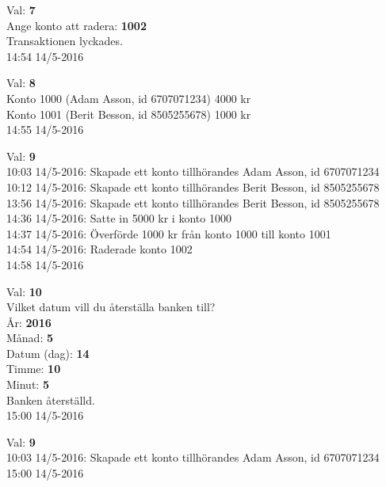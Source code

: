 \begin{multicols}{2}
\begin{exampleblock}
Val: \textbf{7}\\
Ange konto att radera: \textbf{1002}\\
Transaktionen lyckades.\\
14:54 14/5-2016\\
\end{exampleblock}
\begin{exampleblock}
Val: \textbf{8}\\
Konto 1000 (Adam Asson, id 6707071234) 4000 kr\\
Konto 1001 (Berit Besson, id 8505255678) 1000 kr\\
14:55 14/5-2016\\
\end{exampleblock}
\begin{exampleblock}
Val: \textbf{9}\\
10:03 14/5-2016: Skapade ett konto tillhörandes Adam Asson, id 6707071234\\
10:12 14/5-2016: Skapade ett konto tillhörandes Berit Besson, id 8505255678\\
13:56 14/5-2016: Skapade ett konto tillhörandes Berit Besson, id 8505255678\\
14:36 14/5-2016: Satte in 5000 kr i konto 1000\\
14:37 14/5-2016: Överförde 1000 kr från konto 1000 till konto 1001\\
14:54 14/5-2016: Raderade konto 1002\\
14:58 14/5-2016\\
\end{exampleblock}
\begin{exampleblock}
Val: \textbf{10}\\
Vilket datum vill du återställa banken till?\\
År: \textbf{2016}\\
Månad: \textbf{5}\\
Datum (dag): \textbf{14}\\
Timme: \textbf{10}\\
Minut: \textbf{5}\\
Banken återställd.\\
15:00 14/5-2016\\
\end{exampleblock}
\begin{exampleblock}
Val: \textbf{9}\\
10:03 14/5-2016: Skapade ett konto tillhörandes Adam Asson, id 6707071234\\
15:00 14/5-2016\\

\end{exampleblock}
\end{multicols}

